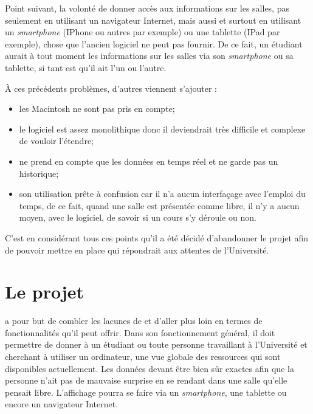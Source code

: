 Point suivant, la volont\'e de donner acc\`es aux informations sur les salles, pas seulement en utilisant un navigateur Internet, mais aussi et surtout en utilisant un \textit{smartphone} (IPhone ou autres par exemple) ou une tablette (IPad par exemple), chose que l'ancien logiciel ne peut pas fournir.
De ce fait, un \'etudiant aurait \`a tout moment les informations sur les salles via son \textit{smartphone} ou sa tablette, si tant est qu'il ait l'un ou l'autre.

\noindent \`A ces pr\'ec\'edents probl\`emes, d'autres viennent s'ajouter :

\begin{itemize}
	\item les Macintosh ne sont pas pris en compte;
	\item le logiciel est assez monolithique donc il deviendrait tr\`es difficile et complexe de vouloir l'\'etendre;
	\item {\Yuukou} ne prend en compte que les donn\'ees en temps r\'eel et ne garde pas un historique;
	\item son utilisation pr\^ete \`a confusion car il n'a aucun interfa\c{c}age avec l'emploi du temps, de ce fait, quand une salle est pr\'esent\'ee comme libre, il n'y a aucun moyen, avec le logiciel, de savoir si un cours s'y d\'eroule ou non.

\end{itemize}

\vspace{0.20cm}

C'est en consid\'erant tous ces points qu'il a \'et\'e d\'ecid\'e d'abandonner le projet \Yuukou{} afin de pouvoir mettre en place \YuukouII{} qui r\'epondrait aux attentes de l'Universit\'e.

\section{Le projet \YuukouII}


\YuukouII{} a pour but de combler les lacunes de \Yuukou{} et d'aller plus loin en termes de fonctionnalit\'es qu'il peut offrir. 
Dans son fonctionnement g\'en\'eral, il doit permettre de donner \`a un \'etudiant ou toute personne travaillant \`a l'Universit\'e et cherchant \`a utiliser un ordinateur, une vue globale des ressources qui sont disponibles actuellement.
Les donn\'ees devant \^etre bien s\^ur exactes afin que la personne n'ait pas de mauvaise surprise en se rendant dans une salle qu'elle pensait libre.
L'affichage pourra se faire via un \textit{smartphone}, une tablette ou encore un navigateur Internet.

